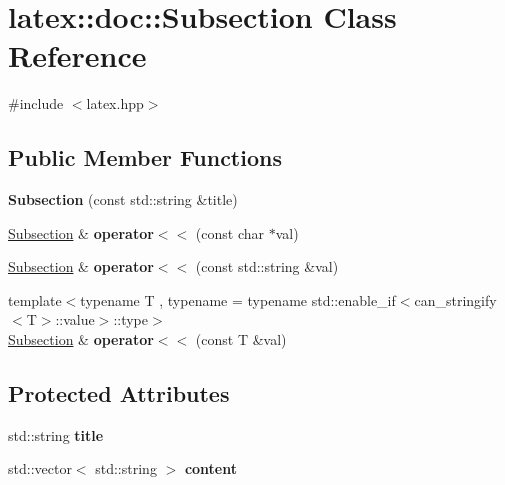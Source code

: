 \hypertarget{classlatex_1_1doc_1_1Subsection}{\section{latex\-:\-:doc\-:\-:Subsection Class Reference}
\label{classlatex_1_1doc_1_1Subsection}
}


{\ttfamily \#include $<$latex.\-hpp$>$}

\subsection*{Public Member Functions}
\begin{DoxyCompactItemize}
\item 
\hypertarget{classlatex_1_1doc_1_1Subsection_a58c86ee6e9d450b75d84a5c4e91ad54a}{{\bfseries Subsection} (const std\-::string \&title)}\label{classlatex_1_1doc_1_1Subsection_a58c86ee6e9d450b75d84a5c4e91ad54a}

\item 
\hypertarget{classlatex_1_1doc_1_1Subsection_a8c8a6a26148c2316ca8f512ae35ad8da}{\hyperlink{classlatex_1_1doc_1_1Subsection}{Subsection} \& {\bfseries operator$<$$<$} (const char $\ast$val)}\label{classlatex_1_1doc_1_1Subsection_a8c8a6a26148c2316ca8f512ae35ad8da}

\item 
\hypertarget{classlatex_1_1doc_1_1Subsection_a7efa65925d268faf43e353a52041e230}{\hyperlink{classlatex_1_1doc_1_1Subsection}{Subsection} \& {\bfseries operator$<$$<$} (const std\-::string \&val)}\label{classlatex_1_1doc_1_1Subsection_a7efa65925d268faf43e353a52041e230}

\item 
\hypertarget{classlatex_1_1doc_1_1Subsection_a5cd1f815a7e416bfb3f5f85b3d8fc09b}{{\footnotesize template$<$typename T , typename  = typename std\-::enable\-\_\-if$<$can\-\_\-stringify$<$\-T$>$\-::value$>$\-::type$>$ }\\\hyperlink{classlatex_1_1doc_1_1Subsection}{Subsection} \& {\bfseries operator$<$$<$} (const T \&val)}\label{classlatex_1_1doc_1_1Subsection_a5cd1f815a7e416bfb3f5f85b3d8fc09b}

\end{DoxyCompactItemize}
\subsection*{Protected Attributes}
\begin{DoxyCompactItemize}
\item 
\hypertarget{classlatex_1_1doc_1_1Subsection_a8d54abcb5a9364cf63e9279b40cfcbf6}{std\-::string {\bfseries title}}\label{classlatex_1_1doc_1_1Subsection_a8d54abcb5a9364cf63e9279b40cfcbf6}

\item 
\hypertarget{classlatex_1_1doc_1_1Subsection_a6d79b427fd95a046a292184777212a3f}{std\-::vector$<$ std\-::string $>$ {\bfseries content}}\label{classlatex_1_1doc_1_1Subsection_a6d79b427fd95a046a292184777212a3f}

\end{DoxyCompactItemize}
